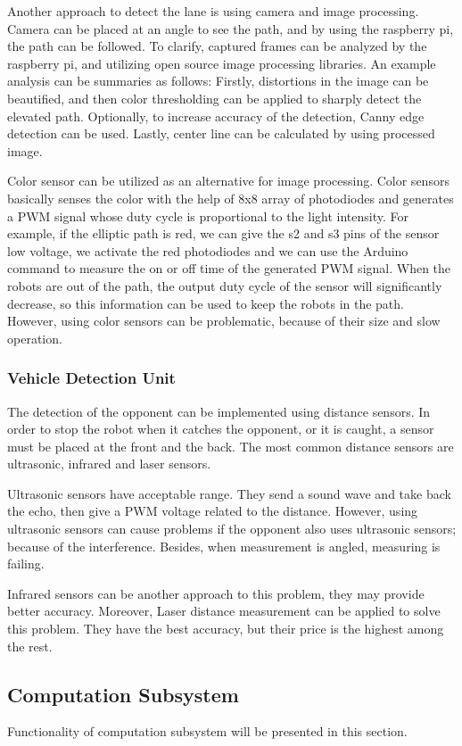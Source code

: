 \documentclass[a4paper,12pt]{article}
\begin{document}
Another approach to detect the lane is using camera and image processing. Camera can be placed at an angle to see the path, and by using the raspberry pi, the path can be followed. To clarify, captured frames can be analyzed by the raspberry pi, and utilizing open source image processing libraries. An example analysis can be summaries as follows: Firstly, distortions in the image can be beautified, and then color thresholding can be applied to sharply detect the elevated path. Optionally, to increase accuracy of the detection, Canny edge detection can be used. Lastly, center line can be calculated by using processed image. 

Color sensor can be utilized as an alternative for image processing. Color sensors basically senses the color with the help of 8x8 array of photodiodes and generates a PWM signal whose duty cycle is proportional to the light intensity. For example, if the elliptic path is red, we can give the s2 and s3 pins of the sensor low voltage, we activate the red photodiodes and we can use the Arduino command to measure the on or off time of the generated PWM signal. When the robots are out of the path, the output duty cycle of the sensor will significantly decrease, so this information can be used to keep the robots in the path. However, using color sensors can be problematic, because of their size and slow operation.

\subsubsection{Vehicle Detection Unit}
The detection of the opponent can be implemented using distance sensors. In order to stop the robot when it catches the opponent, or it is caught, a sensor must be placed at the front and the back. The most common distance sensors are ultrasonic, infrared and laser sensors. 

Ultrasonic sensors have acceptable range. They send a sound wave and take back the echo, then give a PWM voltage related to the distance. However, using ultrasonic sensors can cause problems if the opponent also uses ultrasonic sensors; because of the interference. Besides, when measurement is angled, measuring is failing. 

Infrared sensors can be another approach to this problem, they may provide better accuracy. Moreover, Laser distance measurement can be applied to solve this problem. They have the best accuracy, but their price is the highest among the rest.
\subsection{Computation Subsystem}
Functionality of computation subsystem will be presented in this section.
\end{document}
